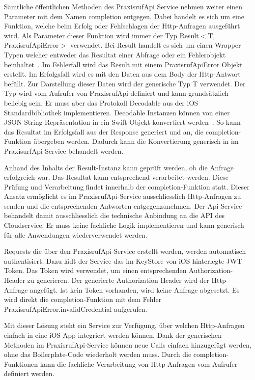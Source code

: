 Sämtliche öffentlichen Methoden des PraxisrufApi Service nehmen weiter einen Parameter mit dem Namen completion entgegen.
Dabei handelt es sich um eine Funktion, welche beim Erfolg oder Fehlschlagen der Http-Anfragen ausgeführt wird.
Als Parameter dieser Funktion wird immer der Typ Result$<$T, PraxisrufApiError$>$ verwendet.
Bei Result handelt es sich um einen Wrapper Typen welcher entweder das Resultat einer Abfrage oder ein Fehlerobjekt beinhaltet~\cite{ios_result}.
Im Fehlerfall wird das Result mit einem PraxisrufApiError Objekt erstellt.
Im Erfolgsfall wird es mit den Daten aus dem Body der Http-Antwort befüllt.
Zur Darstellung dieser Daten wird der generische Typ T verwendet.
Der Typ wird vom Aufrufer von PraxisrufApi definiert und kann grundsätzlich beliebig sein.
Er muss aber das Protokoll Decodable aus der iOS Standardbibliothek implementieren.
Decodable Instanzen können von einer JSON-String-Repräsentation in ein Swift-Objekt konvertiert werden~\cite{ios_decodable}.
So kann das Resultat im Erfolgsfall aus der Response generiert und an, die completion-Funktion übergeben werden.
Dadurch kann die Konvertierung generisch in im PraxisurfApi-Service behandelt werden.

Anhand des Inhalts der Result-Instanz kann geprüft werden, ob die Anfrage erfolgreich war.
Das Resultat kann entsprechend verarbeitet werden.
Diese Prüfung und Verarbeitung findet innerhalb der completion-Funktion statt.
Dieser Ansatz ermöglicht es im PraxisrufApi-Service ausschliesslich Http-Anfragen zu senden und die entsprechenden Antworten entgegenzunehmen.
Der Api Service behandelt damit ausschliesslich die technische Anbindung an die API des Cloudservice.
Er muss keine fachliche Logik implementieren und kann generisch für alle Anwendungen wiederverwendet werden.

Requests die über den PraxisrufApi-Service erstellt werden, werden automatisch authentisiert.
Dazu lädt der Service das im KeyStore von iOS hinterlegte JWT Token.
Das Token wird verwendet, um einen entsprechenden Authorization-Header zu generieren.
Der generierte Authorization Header wird der Http-Anfrage angefügt.
Ist kein Token vorhanden, wird keine Anfrage abgesetzt.
Es wird direkt die completion-Funktion mit dem Fehler PraxisrufApiError.invalidCredential aufgerufen.

Mit dieser Lösung steht ein Service zur Verfügung, über welchen Http-Anfragen einfach in eine iOS App integriert werden können.
Dank der generischen Methoden im PraxisrufApi-Service können neue Calls einfach hinzugefügt werden, ohne das Boilerplate-Code wiederholt werden muss.
Durch die completion-Funktionen kann die fachliche Verarbeitung von Http-Anfragen vom Aufrufer definiert werden.

